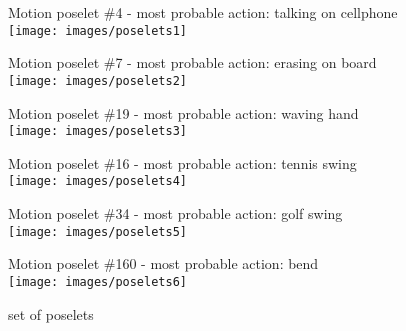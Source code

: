 

\begin{figure*}[ht]
\centering
 Motion poselet \#4 - most probable action: talking on cellphone\\
 \texttt{[image: images/poselets1]}

 Motion poselet \#7 - most probable action: erasing on board\\
 \texttt{[image: images/poselets2]}

 Motion poselet \#19 - most probable action: waving hand\\
 \texttt{[image: images/poselets3]}

 Motion poselet \#16 - most probable action: tennis swing\\
 \texttt{[image: images/poselets4]}

 Motion poselet \#34 - most probable action: golf swing\\
 \texttt{[image: images/poselets5]}

 Motion poselet \#160 - most probable action: bend\\
 \texttt{[image: images/poselets6]}

 \caption{set of poselets}
\end{figure*}
